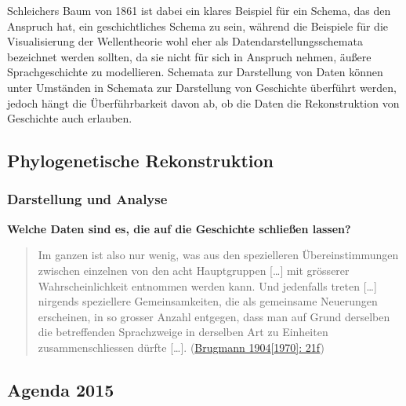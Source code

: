 Schleichers Baum von 1861 ist dabei ein klares Beispiel für ein Schema,
das den Anspruch hat, ein geschichtliches Schema zu sein, während die
Beispiele für die Visualisierung der Wellentheorie wohl eher als
Datendarstellungsschemata bezeichnet werden sollten, da sie nicht für
sich in Anspruch nehmen, äußere Sprachgeschichte zu modellieren.
Schemata zur Darstellung von Daten können unter Umständen in Schemata
zur Darstellung von Geschichte überführt werden, jedoch hängt die
Überführbarkeit davon ab, ob die Daten die Rekonstruktion von Geschichte
auch erlauben.

\subsection{\texorpdfstring{{Phylogenetische
Rekonstruktion}}{Phylogenetische Rekonstruktion}}

\subsubsection{\texorpdfstring{{Darstellung und
Analyse}}{Darstellung und Analyse}}

\textbf{Welche Daten sind es, die auf die Geschichte schließen lassen?}

\begin{quote}
Im ganzen ist also nur wenig, was aus den spezielleren Übereinstimmungen
zwischen einzelnen von den acht Hauptgruppen {[}\ldots{}{]} mit
grösserer Wahrscheinlichkeit entnommen werden kann. Und jedenfalls
treten {[}\ldots{}{]} nirgends speziellere Gemeinsamkeiten, die als
gemeinsame Neuerungen erscheinen, in so grosser Anzahl entgegen, dass
man auf Grund derselben die betreffenden Sprachzweige in derselben Art
zu Einheiten zusammenschliessen dürfte {[}\ldots{}{]}.
(\href{http://bibliography.lingpy.org?key=Brugmann1904}{Brugmann
1904{[}1970{]}: 21f})
\end{quote}

\subsection{\texorpdfstring{{Agenda 2015}}{Agenda 2015}}

